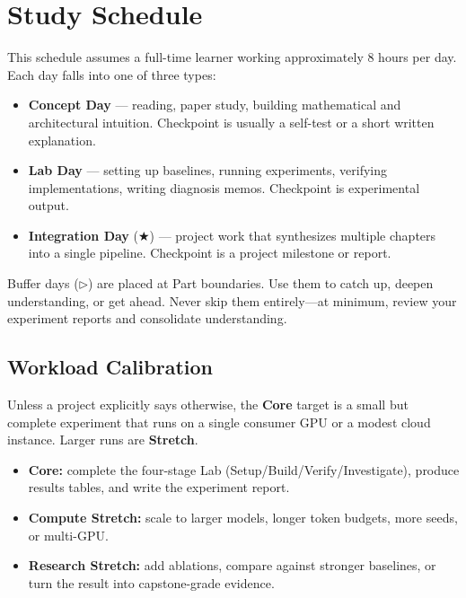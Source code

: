 \chapter*{Study Schedule}

This schedule assumes a full-time learner working approximately 8 hours per day. Each day falls into one of three types:

\begin{itemize}
    \item \textbf{Concept Day} --- reading, paper study, building mathematical and architectural intuition. Checkpoint is usually a self-test or a short written explanation.
    \item \textbf{Lab Day} --- setting up baselines, running experiments, verifying implementations, writing diagnosis memos. Checkpoint is experimental output.
    \item \textbf{Integration Day} ($\bigstar$) --- project work that synthesizes multiple chapters into a single pipeline. Checkpoint is a project milestone or report.
\end{itemize}

\noindent Buffer days ($\triangleright$) are placed at Part boundaries. Use them to catch up, deepen understanding, or get ahead. Never skip them entirely---at minimum, review your experiment reports and consolidate understanding.

\bigskip

\section*{Workload Calibration}

Unless a project explicitly says otherwise, the \textbf{Core} target is a small but complete experiment that runs on a single consumer GPU or a modest cloud instance. Larger runs are \textbf{Stretch}.

\begin{itemize}
    \item \textbf{Core:} complete the four-stage Lab (Setup/Build/Verify/Investigate), produce results tables, and write the experiment report.
    \item \textbf{Compute Stretch:} scale to larger models, longer token budgets, more seeds, or multi-GPU.
    \item \textbf{Research Stretch:} add ablations, compare against stronger baselines, or turn the result into capstone-grade evidence.
\end{itemize}

